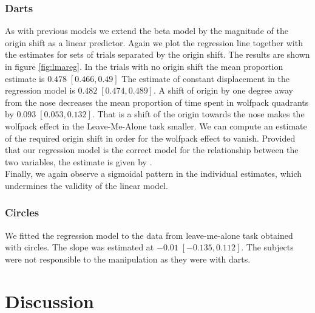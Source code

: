\documentclass[10pt]{article}
\begin{document}
\subsubsection*{Darts}
As with previous models we extend the beta model by the magnitude of the origin shift as a linear predictor. Again we plot the regression line together with the estimates for sets of trials separated by the origin shift. The results are shown in figure \ref{fig:lmareg}. In the trials with no origin shift the mean proportion estimate is $0.478 \; [0.466,0.49]$ %
The estimate of constant displacement in the regression model is $0.482 \; [0.474,0.489]$. A shift of origin by one degree away from the nose decreases the mean proportion of time spent in wolfpack quadrants by $0.093 \; [0.053,0.132]$. That is a shift of the origin towards the nose makes the wolfpack effect in the Leave-Me-Alone task smaller. We can compute an estimate of the required origin shift in order for the wolfpack effect to vanish. Provided that our regression model is the correct model for the relationship between the two variables, the estimate is given by $ $.\\
Finally, we again observe a sigmoidal pattern in the individual estimates, which undermines the validity of the linear model.\\

\subsubsection*{Circles}
We fitted the regression model to the data from leave-me-alone task obtained with circles. The slope was estimated at $-0.01 \; [-0.135,0.112]$. The subjects were not responsible to the manipulation as they were with darts.

\section*{Discussion} 

 

\end{document}
